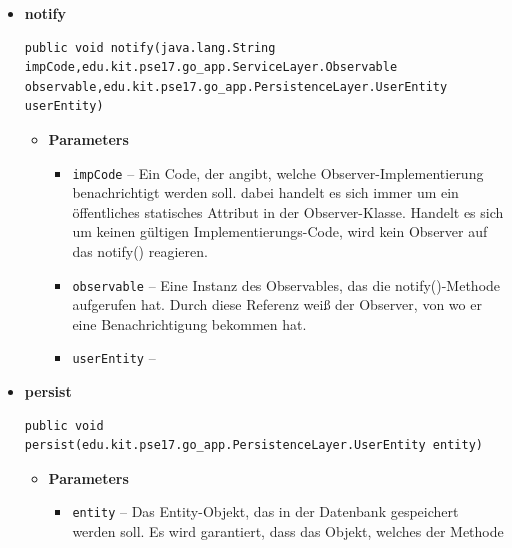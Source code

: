 \documentclass[11pt,a4paper]{article}
\begin{document}
{{{{{{{{{{{{{{\begin{itemize}
{\begin{itemize}
{}%
\end{itemize}
}%
\item{ 
\hypertarget{edu.kit.pse17.go_app.PersistenceLayer.daos.UserDaoImp.notify(java.lang.String, edu.kit.pse17.go_app.ServiceLayer.Observable, edu.kit.pse17.go_app.PersistenceLayer.UserEntity)}{{\bf  notify}\\}
\begin{lstlisting}[frame=none]
public void notify(java.lang.String impCode,edu.kit.pse17.go_app.ServiceLayer.Observable observable,edu.kit.pse17.go_app.PersistenceLayer.UserEntity userEntity)\end{lstlisting} %
\begin{itemize}
\item{
{\bf  Parameters}
  \begin{itemize}
   \item{
\texttt{impCode} -- Ein Code, der angibt, welche Observer-Implementierung benachrichtigt werden soll. dabei handelt es sich immer um ein öffentliches statisches Attribut in der Observer-Klasse. Handelt es sich um keinen gültigen Implementierungs-Code, wird kein Observer auf das notify() reagieren.}
   \item{
\texttt{observable} -- Eine Instanz des Observables, das die notify()-Methode aufgerufen hat. Durch diese Referenz weiß der Observer, von wo er eine Benachrichtigung bekommen hat.}
   \item{
\texttt{userEntity} -- }
  \end{itemize}
}%
\end{itemize}
}%
\item{ 
\hypertarget{edu.kit.pse17.go_app.PersistenceLayer.daos.UserDaoImp.persist(edu.kit.pse17.go_app.PersistenceLayer.UserEntity)}{{\bf  persist}\\}
\begin{lstlisting}[frame=none]
public void persist(edu.kit.pse17.go_app.PersistenceLayer.UserEntity entity)\end{lstlisting} %
\begin{itemize}
\item{
{\bf  Parameters}
  \begin{itemize}
   \item{
\texttt{entity} -- Das Entity-Objekt, das in der Datenbank gespeichert werden soll. Es wird garantiert, dass das Objekt, welches der Methode}
  \end{itemize}
}%

\end{itemize}}
\end{itemize}}}}}}}}}}}}}}}
\end{document}
